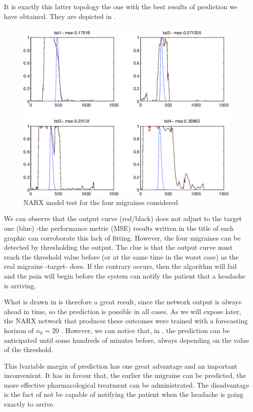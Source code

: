 It is exactly this latter topology the one with the best results of prediction we have obtained. They are depicted in .
\begin{figure}
\centering
\includegraphics[width=\columnwidth]{images/results/trn3_na-nb1-nk20_NN3}
\caption{NARX model test for the four migraines considered}
\label{fig:narxTest}
\end{figure}


We can observe that the output curve (red/black) does not adjust to the target one (blue) -the performance metric (MSE) results written in the title of each graphic can corroborate this lack of fitting. However, the four migraines can be detected by thresholding the output. The clue is that the output curve must reach the threshold value before (or at the same time in the worst case) as the real migraine -target- does. If the contrary occurs, then the algorithm will fail and  the pain will begin before the system can notify the patient that a headache is arriving.

What is drawn in  is therefore a great result, since the network output is always ahead in time, so the prediction is possible in all cases. 
As we will expose later, the NARX network that produces these outcomes were trained with a forecasting horizon of $n_{k}=20$ . 
However, we can notice that, in , the prediction can be anticipated until some hundreds of minutes before, always depending on the value of the threshold. 

This lvariable margin of prediction has one great advantage and an important inconvenient. 
It has in favour that, the earlier the migraine can be predicted, the more effective pharmacological treatment can be administrated.
The disadvantage is the fact of not be capable of notifying the patient when the headache is going exactly to arrive.

